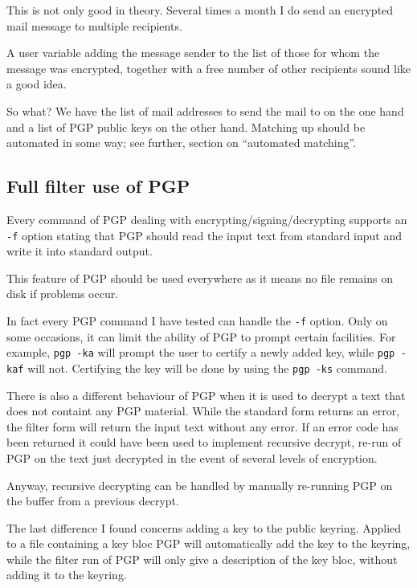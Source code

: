 This is not only  good in theory. Several times  a month I do  send an
encrypted mail message to multiple recipients.

A user variable  adding the message sender  to  the list of  those for
whom the  message was encrypted, together with  a free number of other
recipients sound like a good idea.

So what? We have the list of mail addresses to send the mail to on the
one hand and a list of PGP public keys on the other hand.  Matching up
should be  automated in some way;  see further, section on ``automated
matching''.

\subsection{Full filter use of PGP}

Every   command of   PGP   dealing  with encrypting/signing/decrypting
supports an {\tt  -f} option  stating  that PGP should read  the input
text from standard input and write it into standard output.

This  feature of PGP should   be used everywhere as  it means no file
remains on disk if problems occur.

In  fact every PGP  command  I have  tested  can  handle the {\tt  -f}
option.  Only on  some occasions, it can limit  the ability of PGP  to
prompt certain facilities. For example, {\tt  pgp~-ka} will prompt the
user  to certify a newly  added key, while  {\tt pgp~-kaf} will not.
Certifying the key will be done by using the {\tt pgp~-ks} command.

There is also a different behaviour of PGP when it  is used to decrypt
a text that does  not containt any PGP  material.  While the  standard
form returns  an error,  the filter form  will return  the input  text
without any error.  If an error  code has been  returned it could have
been  used to implement recursive decrypt,  re-run of PGP  on the text
just decrypted in the event of several levels of encryption.

Anyway,    recursive   decrypting can  be  handled   by manually
re-running PGP on the buffer from a previous decrypt.

The  last difference I  found  concerns adding  a   key to  the public
keyring.   Applied to  a  file   containing  a   key  bloc PGP    will
automatically add the key to the keyring,  while the filter run of PGP
will only give a description of the key bloc, without adding it to the
keyring.


